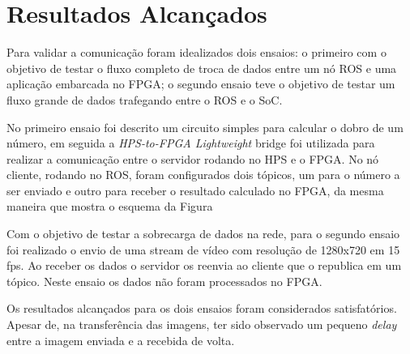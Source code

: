 \chapter{Resultados Alcançados}\label{cap:result}

Para validar a comunicação foram idealizados dois ensaios: o primeiro com o objetivo de testar o fluxo completo de troca de dados entre um nó ROS e uma aplicação embarcada no FPGA; o segundo ensaio teve o objetivo de testar um fluxo grande de dados trafegando entre o ROS e o SoC.

No primeiro ensaio foi descrito um circuito simples para calcular o dobro de um número, em seguida a \textit{HPS-to-FPGA Lightweight} bridge foi utilizada para realizar a comunicação entre o servidor rodando no HPS e o FPGA\@. No nó cliente, rodando no ROS, foram configurados dois tópicos, um para o número a ser enviado e outro para receber o resultado calculado no FPGA, da mesma maneira que mostra o esquema da Figura 

Com o objetivo de testar a sobrecarga de dados na rede, para o segundo ensaio foi realizado o envio de uma stream de vídeo com resolução de 1280x720 em 15 fps. Ao receber os dados o servidor os reenvia ao cliente que o republica em um tópico. Neste ensaio os dados não foram processados no FPGA\@. 

Os resultados alcançados para os dois ensaios foram considerados satisfatórios. Apesar de, na transferência das imagens, ter sido observado um pequeno \textit{delay} entre a imagem enviada e a recebida de volta.